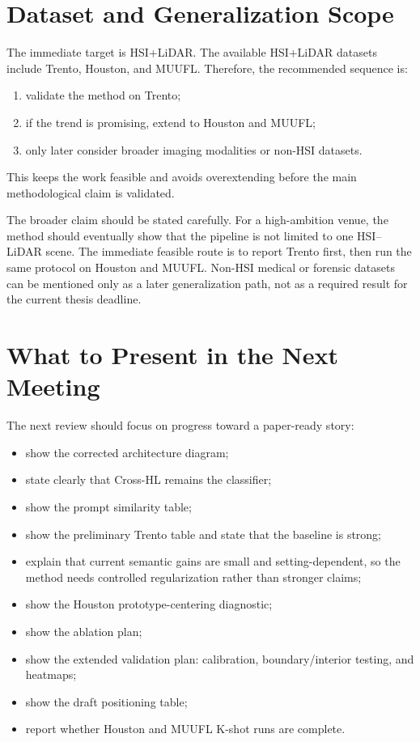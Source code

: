 \documentclass[10pt,journal,compsoc]{IEEEtran}
\begin{document}
\section{Dataset and Generalization Scope}

The immediate target is HSI+LiDAR. The available HSI+LiDAR datasets include Trento, Houston, and MUUFL. Therefore, the recommended sequence is:

\begin{enumerate}
    \item validate the method on Trento;
    \item if the trend is promising, extend to Houston and MUUFL;
    \item only later consider broader imaging modalities or non-HSI datasets.
\end{enumerate}

This keeps the work feasible and avoids overextending before the main methodological claim is validated.

The broader claim should be stated carefully. For a high-ambition venue, the method should eventually show that the pipeline is not limited to one HSI--LiDAR scene. The immediate feasible route is to report Trento first, then run the same protocol on Houston and MUUFL. Non-HSI medical or forensic datasets can be mentioned only as a later generalization path, not as a required result for the current thesis deadline.

\section{What to Present in the Next Meeting}

The next review should focus on progress toward a paper-ready story:

\begin{itemize}
    \item show the corrected architecture diagram;
    \item state clearly that Cross-HL remains the classifier;
    \item show the prompt similarity table;
    \item show the preliminary Trento table and state that the baseline is strong;
    \item explain that current semantic gains are small and setting-dependent, so the method needs controlled regularization rather than stronger claims;
    \item show the Houston prototype-centering diagnostic;
    \item show the ablation plan;
    \item show the extended validation plan: calibration, boundary/interior testing, and heatmaps;
    \item show the draft positioning table;
    \item report whether Houston and MUUFL K-shot runs are complete.
\end{itemize}
\end{document}
